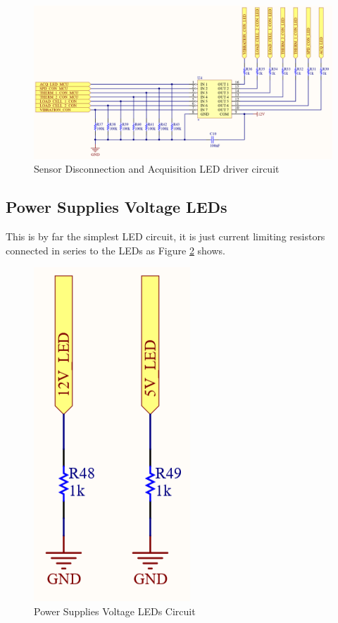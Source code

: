 			\begin{figure}[htbp]
				\centering
					\includegraphics[scale=0.7]{figuras/fig-leds-sensor-disconnection-acquisition-circuit.png}
				\caption{Sensor Disconnection and Acquisition LED driver circuit \cite{leds-sensor-disconnection-acquisition-circuit}}
				\label{fig:leds-sensor-disconnection-acquisition-circuit}
			\end{figure}

	\subsection{Power Supplies Voltage LEDs}\label{ssec:power-supplis-voltage-leds}

		This is by far the simplest LED circuit, it is just current limiting resistors connected in series to the LEDs as Figure \ref{fig:power-supplies-leds} shows.

			\begin{figure}[htbp]
				\centering
					\includegraphics[scale=1.3]{figuras/fig-power-supplies-leds.png}
				\caption{Power Supplies Voltage LEDs Circuit \cite{power-supplies-leds}}
				\label{fig:power-supplies-leds}
			\end{figure}